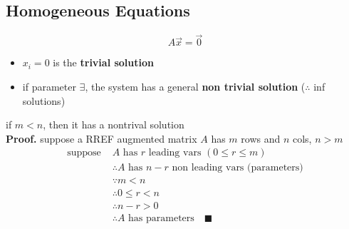     \subsection{Homogeneous Equations}
        \begin{definition}
			$$A\vec x=\vec 0$$
            \begin{itemize}
                \item $x_i=0$ is the \textbf{trivial solution}
                \item if parameter $\exists$, the system has a general \textbf{non trivial solution} ($\therefore$ inf solutions)
            \end{itemize}
        \end{definition}
        \begin{theorem}[$A\vec x=\vec0$ for $A\in\mathbb{R}^{m\times n}$]
            if $m<n$, then it has a nontrival solution\\
            \textbf{Proof.} suppose a RREF augmented matrix $A$ has $m$ rows and $n$ cols, $n>m$
            \begin{align*}
                \text{suppose }&A\text{ has }r\text{ leading vars }(0\le r\le m)\\
                &\therefore A\text{ has }n-r\text{ non leading vars (parameters)}\\
                &\because m<n\\
                &\therefore 0\le r<n\\
                &\therefore n-r>0\\
                &\therefore A\text{ has parameters}\quad\blacksquare
            \end{align*}
        \end{theorem}
